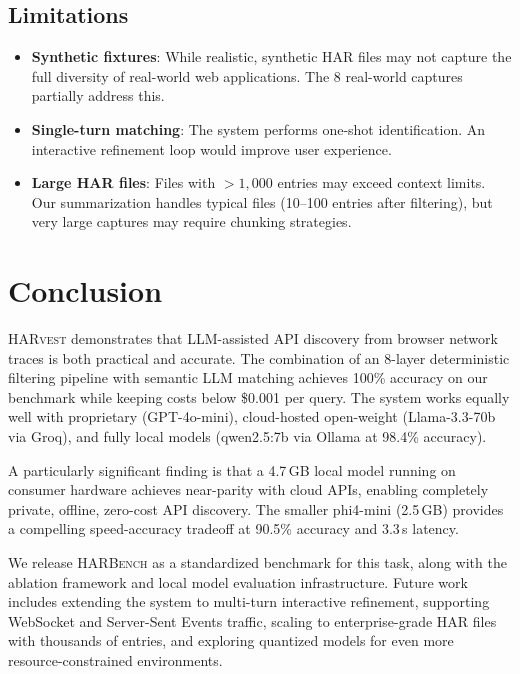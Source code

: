 \documentclass[10pt,twocolumn]{article}
\begin{document}
\subsection{Limitations}

\begin{itemize}[nosep]
  \item \textbf{Synthetic fixtures}: While realistic, synthetic HAR files may not capture the full diversity of real-world web applications. The 8 real-world captures partially address this.
  \item \textbf{Single-turn matching}: The system performs one-shot identification. An interactive refinement loop would improve user experience.
  \item \textbf{Large HAR files}: Files with ${>}1{,}000$ entries may exceed context limits. Our summarization handles typical files (10--100 entries after filtering), but very large captures may require chunking strategies.
\end{itemize}

\section{Conclusion}

\textsc{HARvest} demonstrates that LLM-assisted API discovery from browser network traces is both practical and accurate. The combination of an 8-layer deterministic filtering pipeline with semantic LLM matching achieves 100\% accuracy on our benchmark while keeping costs below \$0.001 per query. The system works equally well with proprietary (GPT-4o-mini), cloud-hosted open-weight (Llama-3.3-70b via Groq), and fully local models (qwen2.5:7b via Ollama at 98.4\% accuracy).

A particularly significant finding is that a 4.7\,GB local model running on consumer hardware achieves near-parity with cloud APIs, enabling completely private, offline, zero-cost API discovery. The smaller phi4-mini (2.5\,GB) provides a compelling speed-accuracy tradeoff at 90.5\% accuracy and 3.3\,s latency.

We release \textsc{HARBench} as a standardized benchmark for this task, along with the ablation framework and local model evaluation infrastructure. Future work includes extending the system to multi-turn interactive refinement, supporting WebSocket and Server-Sent Events traffic, scaling to enterprise-grade HAR files with thousands of entries, and exploring quantized models for even more resource-constrained environments.
\end{document}
